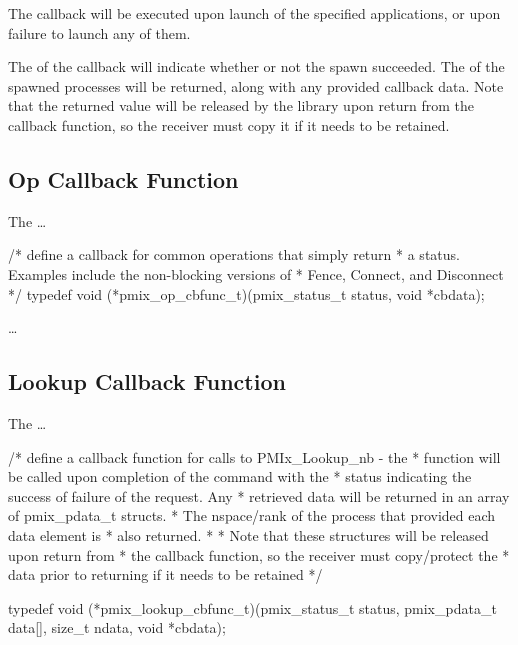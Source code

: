 \descr

The callback will be executed upon launch of the specified applications, or upon failure to launch any of them.

The  of the callback will indicate whether or not the spawn succeeded.
The  of the spawned processes will be returned, along with any provided callback data.
Note that the returned  value will be released by the library upon return from the callback function, so the receiver must copy it if it needs to be retained.


\subsection{Op Callback Function}

The  \ldots

\cspecificstart
\begin{codepar}
/* define a callback for common operations that simply return
 * a status. Examples include the non-blocking versions of
 * Fence, Connect, and Disconnect */
typedef void (*pmix_op_cbfunc_t)(pmix_status_t status, void *cbdata);
\end{codepar}
\cspecificend

\descr

\ldots


\subsection{Lookup Callback Function}

The  \ldots

\cspecificstart
\begin{codepar}
/* define a callback function for calls to PMIx_Lookup_nb - the
 * function will be called upon completion of the command with the
 * status indicating the success of failure of the request. Any
 * retrieved data will be returned in an array of pmix_pdata_t structs.
 * The nspace/rank of the process that provided each data element is
 * also returned.
 *
 * Note that these structures will be released upon return from
 * the callback function, so the receiver must copy/protect the
 * data prior to returning if it needs to be retained */

typedef void (*pmix_lookup_cbfunc_t)(pmix_status_t status,
                                     pmix_pdata_t data[], size_t ndata,
                                     void *cbdata);
\end{codepar}
\cspecificend

